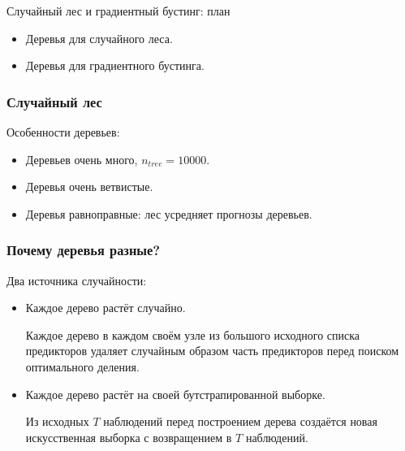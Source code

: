
\begin{frame} %

  
  \end{frame}
  
  
  
  \begin{frame}{Случайный лес и градиентный бустинг: план}
    \begin{itemize}[<+->]
      \item Деревья для случайного леса.
      \item Деревья для градиентного бустинга.
    \end{itemize}
  
  \end{frame}
  

  \begin{frame}
    \frametitle{Случайный лес}

    Особенности деревьев:
    \begin{itemize}[<+->]
      \item Деревьев очень \alert{много}, $n_{tree} = 10000$.
      \item Деревья очень \alert{ветвистые}.
      \item Деревья равноправные: лес \alert{усредняет} прогнозы деревьев.  
    \end{itemize}
  \end{frame}

  \begin{frame}
    \frametitle{Почему деревья разные?}

      Два источника \alert{случайности}:
      \begin{itemize}[<+->]
        \item Каждое дерево растёт случайно. 
        
        Каждое дерево в \alert{каждом своём узле} из большого исходного списка предикторов 
        \alert{удаляет} случайным образом часть предикторов перед поиском оптимального деления. 

        \item Каждое дерево растёт на своей бутстрапированной выборке. 
        
        Из исходных $T$ наблюдений перед построением дерева создаётся новая \alert{искусственная выборка с возвращением} 
        в $T$ наблюдений. 
      \end{itemize}
  \end{frame}

